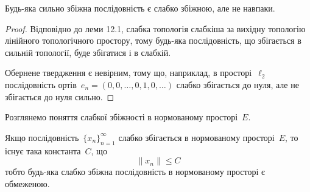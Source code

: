 \begin{lemma}
Будь-яка сильно збіжна послідовність є слабко
збіжною, але не навпаки.
\end{lemma}

\begin{proof}
Відповідно до \error леми 12.1, слабка топологія
слабкіша за вихідну топологію лінійного топологічного
простору, тому будь-яка послідовність, що збігається в
сильній топології, буде збігатися і в слабкій.

Обернене твердження є невірним, тому що, наприклад, в
просторі~$\ell_2$ послідовність ортів~$e_n = (0, 0, \dots, 0, 1, 0, \dots)$ слабко
збігається до нуля, але не збігається до нуля сильно. 
\end{proof}

Розглянемо поняття слабкої збіжності в нормованому
просторі~$E$.

\begin{theorem}
Якщо послідовність~$\{x_n\}_{n = 1}^\infty$
слабко збігається в нормованому просторі~$E$, то існує така
константа~$C$, що
\begin{equation*}
    \|x_n\| \le C
\end{equation*}
тобто будь-яка слабко збіжна послідовність в нормованому
просторі є обмеженою.
\end{theorem}

